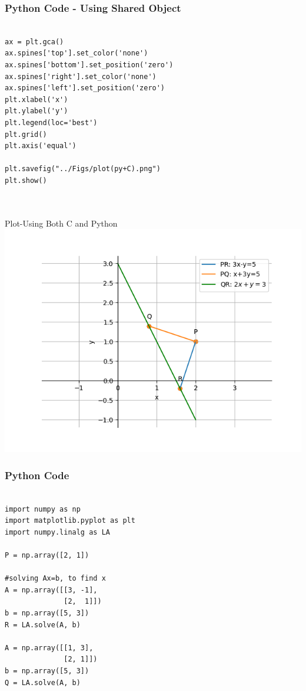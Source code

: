 \documentclass{beamer}
\begin{document}
\begin{frame}[fragile]
    \frametitle{Python Code - Using Shared Object}
    \begin{lstlisting}
    
ax = plt.gca()
ax.spines['top'].set_color('none')
ax.spines['bottom'].set_position('zero')
ax.spines['right'].set_color('none')
ax.spines['left'].set_position('zero')
plt.xlabel('x')
plt.ylabel('y')
plt.legend(loc='best')
plt.grid()
plt.axis('equal')

plt.savefig("../Figs/plot(py+C).png")
plt.show()



\end{lstlisting}
\end{frame}

\begin{frame}{Plot-Using Both C and Python}
    \centering
    \includegraphics[width=\columnwidth, height=0.8\textheight, keepaspectratio]{Figs/plot(py+C).png}     
\end{frame}



\begin{frame}[fragile]
    \frametitle{Python Code}
    \begin{lstlisting}

import numpy as np
import matplotlib.pyplot as plt
import numpy.linalg as LA

P = np.array([2, 1])

#solving Ax=b, to find x
A = np.array([[3, -1],
              [2,  1]])
b = np.array([5, 3])
R = LA.solve(A, b)

A = np.array([[1, 3],
              [2, 1]])
b = np.array([5, 3])
Q = LA.solve(A, b)



\end{lstlisting}
\end{frame}
\end{document}
